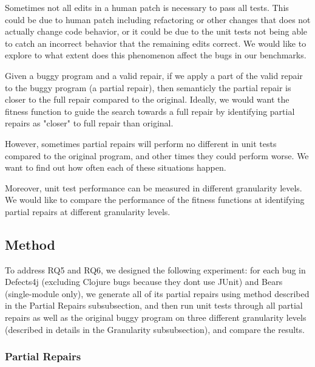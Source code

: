 \documentclass[sigconf, timestamp-false, anonymous=true]{acmart}
\begin{document}

Sometimes not all edits in a human patch is necessary to pass all tests. This could be
due to human patch including refactoring or other changes that does not actually
change code behavior, or it could be due to the unit tests not being able to catch
an incorrect behavior that the remaining edits correct. We would like to explore
to what extent does this phenomenon affect the bugs in our benchmarks.


Given a buggy program and a valid repair, if we apply a part of the valid repair to 
the buggy program (a partial repair), then semanticly the partial repair is closer
 to the full repair compared to the original. 
Ideally, we would want the fitness function to guide the search towards a full 
repair by identifying partial repairs as "closer" to full repair than original.

However, sometimes partial repairs will perform no different in unit tests compared 
to the original program, and other times they could perform worse. We want to find 
out how often each of these situations happen.

Moreover, unit test performance can be measured in different granularity levels. 
We would like to compare the performance of the fitness functions at identifying 
partial repairs at different granularity levels.


\subsection{Method}

To address RQ5 and RQ6, we designed the following experiment: for each bug in 
Defects4j 
(excluding Clojure bugs because they dont use JUnit) 
and Bears (single-module only), we generate all of its partial repairs using method described in 
the Partial Repairs subsubsection, and then run unit tests through all partial repairs
as well as the original buggy program on three different granularity levels (described
in details in the Granularity subsubsection), and compare the results.

\subsubsection{Partial Repairs}
\end{document}
